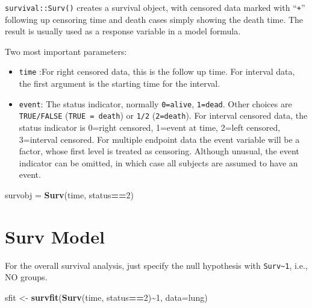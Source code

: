 \documentclass[
]{ctexart}
\newenvironment{Shaded}{\begin{snugshade}}{\end{snugshade}}
\newcommand{\AttributeTok}[1]{\textcolor[rgb]{0.13,0.29,0.53}{#1}}
\newcommand{\DecValTok}[1]{\textcolor[rgb]{0.00,0.00,0.81}{#1}}
\newcommand{\FunctionTok}[1]{\textcolor[rgb]{0.13,0.29,0.53}{\textbf{#1}}}
\newcommand{\NormalTok}[1]{#1}
\newcommand{\OtherTok}[1]{\textcolor[rgb]{0.56,0.35,0.01}{#1}}
\newcommand{\SpecialCharTok}[1]{\textcolor[rgb]{0.81,0.36,0.00}{\textbf{#1}}}
\providecommand{\tightlist}{%
  \setlength{\itemsep}{0pt}\setlength{\parskip}{0pt}}
\begin{document}
\texttt{survival::Surv()} creates a survival object, with censored data
marked with ``\texttt{+}'' following up censoring time and death cases
simply showing the death time. The result is usually used as a response
variable in a model formula.

Two most important parameters:

\begin{itemize}
\tightlist
\item
  \texttt{time} :For right censored data, this is the follow up time.
  For interval data, the first argument is the starting time for the
  interval.
\item
  \texttt{event}: The status indicator, normally \texttt{0=alive},
  \texttt{1=dead}. Other choices are \texttt{TRUE/FALSE}
  (\texttt{TRUE\ =\ death}) or \texttt{1/2} (\texttt{2=death}). For
  interval censored data, the status indicator is 0=right censored,
  1=event at time, 2=left censored, 3=interval censored. For multiple
  endpoint data the event variable will be a factor, whose first level
  is treated as censoring. Although unusual, the event indicator can be
  omitted, in which case all subjects are assumed to have an event.
\end{itemize}

\begin{Shaded}
\begin{Highlighting}[]
\NormalTok{survobj }\OtherTok{=} \FunctionTok{Surv}\NormalTok{(time, status}\SpecialCharTok{==}\DecValTok{2}\NormalTok{)}
\end{Highlighting}
\end{Shaded}

\hypertarget{surv-model}{%
\section{Surv Model}\label{surv-model}}

For the overall survival analysis, just specify the null hypothesis with
\texttt{Surv\textasciitilde{}1}, i.e., NO groups.

\begin{Shaded}
\begin{Highlighting}[]
\NormalTok{sfit }\OtherTok{\textless{}{-}} \FunctionTok{survfit}\NormalTok{(}\FunctionTok{Surv}\NormalTok{(time, status}\SpecialCharTok{==}\DecValTok{2}\NormalTok{)}\SpecialCharTok{\textasciitilde{}}\DecValTok{1}\NormalTok{, }\AttributeTok{data=}\NormalTok{lung)}
\end{Highlighting}
\end{Shaded}
\end{document}
